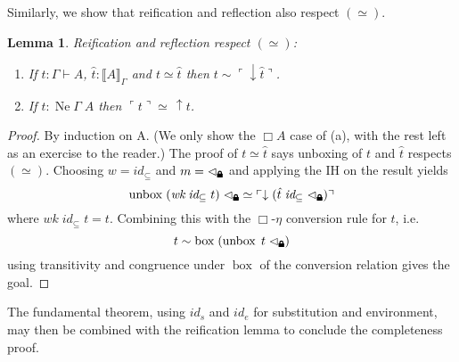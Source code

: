 \documentclass{article}
\newtheorem{lemma}[theorem]{Lemma}
\theoremstyle{definition}\newtheorem{definition}{Definition}
\newcommand{\lock}{\text{\tikz[baseline]{
      \fill[rounded corners=.1ex] (-.75ex,0) rectangle (.75ex,1ex);
      \draw[line width=.3ex] (-.4ex,.5ex) -- ++(0,.75ex) arc (180:0:.4ex) -- ++(0,-.75ex);
}}}
\begin{document}
Similarly, we show that reification and reflection also respect $(\simeq)$.
\begin{lemma}
  Reification and reflection respect $(\simeq)$:
  \begin{enumerate}
    \renewcommand{\theenumi}{\alph{enumi}}
  \item If $t : \Gamma \vdash A$, $\hat t : \llbracket A \rrbracket_\Gamma$
    and $t \simeq \hat t$ then $t \sim \ulcorner \downarrow\hat t \urcorner$.
  \item If $t : \operatorname{Ne} \Gamma \; A$ then $\ulcorner t \urcorner \simeq \, \uparrow t$.
  \end{enumerate}
\end{lemma}
\begin{proof}
  By induction on A.
  (We only show the $\Box A$ case of (a),
  with the rest left as an exercise to the reader.)
  The proof of $t \simeq \hat t$ says unboxing of $t$ and $\hat t$ respects $(\simeq)$.
  Choosing $w = \textit{id}_\subseteq$ and $m = \lhd_\lock$
  and applying the IH on the result yields
  $$ \operatorname{unbox} \; (\textit{wk} \; \textit{id}_\subseteq \; t) \; \lhd_\lock \simeq \ulcorner \downarrow (\hat t \; \textit{id}_\subseteq \; \lhd_\lock) \urcorner $$
  where $\textit{wk} \; \textit{id}_\subseteq \; t = t$.
  Combining this with the $\Box\text{-}\eta$ conversion rule for $t$, i.e.
  $$ t \sim \operatorname{box} \; (\operatorname{unbox} \; t \; \lhd_\lock) $$
  using transitivity and congruence under $\operatorname{box}$
  of the conversion relation gives the goal.
\end{proof}

The fundamental theorem,
using $\textit{id}_s$ and $\textit{id}_e$ for substitution and environment,
may then be combined with the reification lemma
to conclude the completeness proof.
\end{document}
